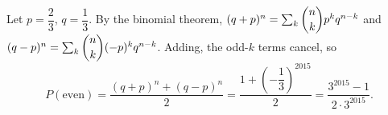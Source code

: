 Let $p=\dfrac{2}{3}$, $q=\dfrac{1}{3}$. By the binomial theorem, $(q+p)^n=\sum_k\dbinom nk p^kq^{n-k}$ and $(q-p)^n=\sum_k\dbinom nk(-p)^kq^{n-k}$. Adding, the odd-$k$ terms cancel, so
\[
P(\text{even})=\dfrac{(q+p)^n+(q-p)^n}{2}=\dfrac{1+\left(-\dfrac{1}{3}\right)^{2015}}{2}=\boxed{\dfrac{3^{2015}-1}{2\cdot3^{2015}}}.
\]
